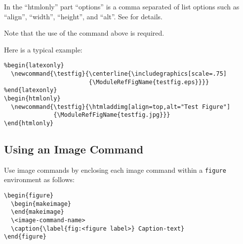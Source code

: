 \documentclass[11pt]{article}
\newcommand{\latexenv}[1]{\texttt{#1}}
\begin{document}
In the ``htmlonly'' part ``options'' is a comma separated of list options
such as ``align'', ``width'', ``height'', and ``alt''.  See  for details.

Note that the use of the  command above is
required.

Here is a typical example:
%
\begin{verbatim}
%begin{latexonly}
  \newcommand{\testfig}{\centerline{\includegraphics[scale=.75]
                        {\ModuleRefFigName{testfig.eps}}}}
%end{latexonly}
\begin{htmlonly}
  \newcommand{\testfig}{\htmladdimg[align=top,alt="Test Figure"]
              {\ModuleRefFigName{testfig.jpg}}}
\end{htmlonly}
\end{verbatim}




\subsection{Using an Image Command}
\label{sec:useimgcmd}

Use image commands by enclosing each image
command within a \latexenv{figure} environment as follows:

\begin{verbatim}
\begin{figure}
  \begin{makeimage}
  \end{makeimage}
  \<image-command-name>
  \caption{\label{fig:<figure label>} Caption-text}
\end{figure}
\end{verbatim}

\end{document}
